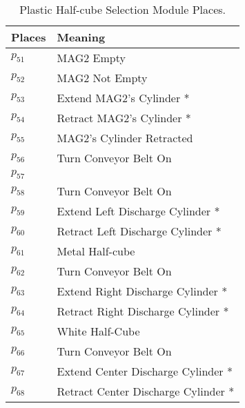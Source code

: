 \begin{table}[H]
\caption{Plastic Half-cube Selection Module Places.}
\centering
\begin{tabular}{M{5cm}M{10cm}}
Places & Meaning\\
\hline
\hyperlink{partialNet:p51}{\hypertarget{partialTable:p51}{$p_{51}$}} & MAG2 Empty\\
\hyperlink{partialNet:p52}{\hypertarget{partialTable:p52}{$p_{52}$}} & MAG2 Not Empty\\
\hyperlink{partialNet:p53}{\hypertarget{partialTable:p53}{$p_{53}$}} & Extend MAG2's Cylinder *\\
\hyperlink{partialNet:p54}{\hypertarget{partialTable:p54}{$p_{54}$}} & Retract MAG2's Cylinder *\\
\hyperlink{partialNet:p55}{\hypertarget{partialTable:p55}{$p_{55}$}} & MAG2's Cylinder Retracted\\
\hyperlink{partialNet:p56}{\hypertarget{partialTable:p56}{$p_{56}$}} & Turn Conveyor Belt On\\
\hyperlink{partialNet:p57}{\hypertarget{partialTable:p57}{$p_{57}$}} & \\
\hyperlink{partialNet:p58}{\hypertarget{partialTable:p58}{$p_{58}$}} & Turn Conveyor Belt On\\
\hyperlink{partialNet:p59}{\hypertarget{partialTable:p59}{$p_{59}$}} & Extend Left Discharge Cylinder *\\
\hyperlink{partialNet:p60}{\hypertarget{partialTable:p60}{$p_{60}$}} & Retract Left Discharge Cylinder *\\
\hyperlink{partialNet:p61}{\hypertarget{partialTable:p61}{$p_{61}$}} & Metal Half-cube\\
\hyperlink{partialNet:p62}{\hypertarget{partialTable:p62}{$p_{62}$}} & Turn Conveyor Belt On\\
\hyperlink{partialNet:p63}{\hypertarget{partialTable:p63}{$p_{63}$}} & Extend Right Discharge Cylinder *\\
\hyperlink{partialNet:p64}{\hypertarget{partialTable:p64}{$p_{64}$}} & Retract Right Discharge Cylinder *\\
\hyperlink{partialNet:p65}{\hypertarget{partialTable:p65}{$p_{65}$}} & White Half-Cube\\
\hyperlink{partialNet:p66}{\hypertarget{partialTable:p66}{$p_{66}$}} & Turn Conveyor Belt On\\
\hyperlink{partialNet:p67}{\hypertarget{partialTable:p67}{$p_{67}$}} & Extend Center Discharge Cylinder *\\
\hyperlink{partialNet:p68}{\hypertarget{partialTable:p68}{$p_{68}$}} & Retract Center Discharge Cylinder *\\

\end{tabular}
\end{table}
